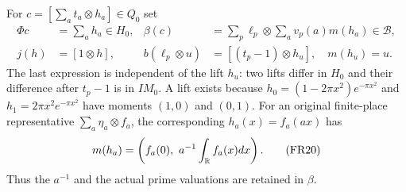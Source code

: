 \documentclass[11pt]{article}
\begin{document}
For $c=[\sum_a t_a\otimes h_a]\in Q_0$ set
\begin{align}
 \Phi c&=\sum_a h_a\in H_0,&
 \beta(c)&=\sum_p\ell_p\otimes\sum_a v_p(a)m(h_a)\in\mathcal B,\tag{FR18}\\
 j(h)&=[1\otimes h],&
 b(\ell_p\otimes u)&=[(t_p-1)\otimes h_u],\quad m(h_u)=u.
 \tag{FR19}
\end{align}
The last expression is independent of the lift $h_u$: two lifts differ in $H_0$ and their difference after $t_p-1$ is in $IM_0$. A lift exists because
$h_0=(1-2\pi x^2)e^{-\pi x^2}$ and $h_1=2\pi x^2e^{-\pi x^2}$ have moments $(1,0)$ and $(0,1)$.
For an original finite-place representative $\sum_a\eta_a\otimes f_a$, the corresponding $h_a(x)=f_a(ax)$ has
\begin{equation}
 m(h_a)=\left(f_a(0),\ a^{-1}\int_\mathbb R f_a(x)dx\right).
 \tag{FR20}
\end{equation}
Thus the $a^{-1}$ and the actual prime valuations are retained in $\beta$.
\end{document}

